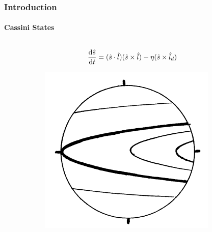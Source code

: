 \documentclass[dvipsnames]{beamer}
\newcommand*{\rd}[2]{\frac{\mathrm{d}#1}{\mathrm{d}#2}}
\DeclarePairedDelimiter\p{\lparen}{\rparen}
\begin{document}
\begin{frame}
    \frametitle{Introduction}
    \framesubtitle{Cassini States}

    \begin{columns}
        \begin{column}{0.5\textwidth}
            \begin{equation*}
                \rd{\hat{s}}{t}
                    = \p{\hat{s} \cdot \hat{l}}
                        \p{\hat{s} \times \hat{l}}
                    - \eta\p{\hat{s} \times \hat{l}_d}
            \end{equation*}
            \begin{figure}
                \centering
                \begin{subfigure}{0.3\textwidth}
                    \centering
                    \includegraphics[width=\textwidth]{cs_fig0.png}
                \end{subfigure}
                \begin{subfigure}{0.3\textwidth}
                    \centering

\end{subfigure}
\end{figure}
\end{column}
\end{columns}
\end{frame}
\end{document}
